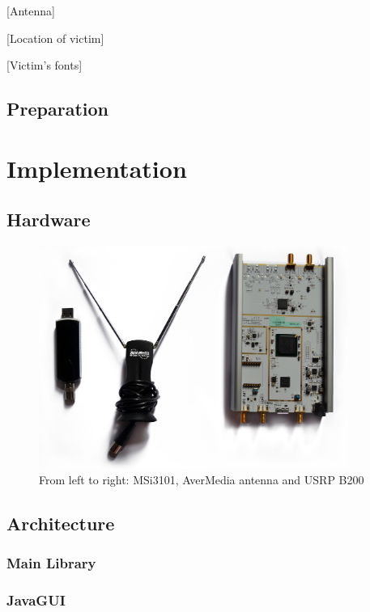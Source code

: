 \documentclass[a4paper,12pt,twoside,openright]{report}
\begin{document}
[Antenna]

[Location of victim]

[Victim's fonts]

\section{Preparation}

\chapter{Implementation} 

\section{Hardware}
\label{sec:hw} 

\begin{figure}[h!]
 
  \centering
    \includegraphics[width=0.9\textwidth]{equipment}
    \caption{From left to right: MSi3101, AverMedia antenna and USRP B200}
\end{figure}


\section{Architecture}

\subsection{Main Library}

\subsection{JavaGUI}
\end{document}
